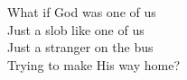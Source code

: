 What if God was one of us \\
Just a slob like one of us \\
Just a stranger on the bus \\
Trying to make His way home?
